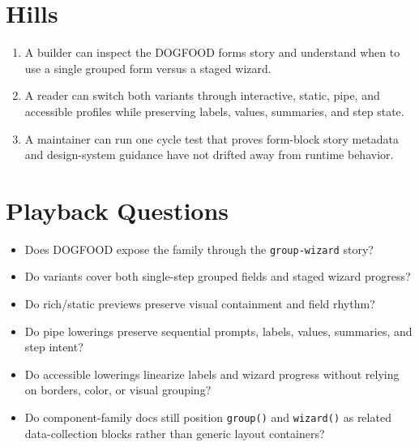 \section{Hills}\label{record-097-hills}

\begin{enumerate}
\def\labelenumi{\arabic{enumi}.}
\tightlist
\item
  A builder can inspect the DOGFOOD forms story and understand when to use a single grouped form versus a staged wizard.
\item
  A reader can switch both variants through interactive, static, pipe, and accessible profiles while preserving labels, values, summaries, and step state.
\item
  A maintainer can run one cycle test that proves form-block story metadata and design-system guidance have not drifted away from runtime behavior.
\end{enumerate}

\section{Playback Questions}\label{record-097-playback-questions}

\begin{itemize}
\tightlist
\item
  Does DOGFOOD expose the family through the \texttt{g\allowbreak{}r\allowbreak{}o\allowbreak{}u\allowbreak{}p\allowbreak{}-\allowbreak{}w\allowbreak{}i\allowbreak{}z\allowbreak{}a\allowbreak{}r\allowbreak{}d} story?
\item
  Do variants cover both single-step grouped fields and staged wizard progress?
\item
  Do rich/static previews preserve visual containment and field rhythm?
\item
  Do pipe lowerings preserve sequential prompts, labels, values, summaries, and step intent?
\item
  Do accessible lowerings linearize labels and wizard progress without relying on borders, color, or visual grouping?
\item
  Do component-family docs still position \texttt{g\allowbreak{}r\allowbreak{}o\allowbreak{}u\allowbreak{}p\allowbreak{}(\allowbreak{})} and \texttt{w\allowbreak{}i\allowbreak{}z\allowbreak{}a\allowbreak{}r\allowbreak{}d\allowbreak{}(\allowbreak{})} as related data-collection blocks rather than generic layout containers?
\end{itemize}

